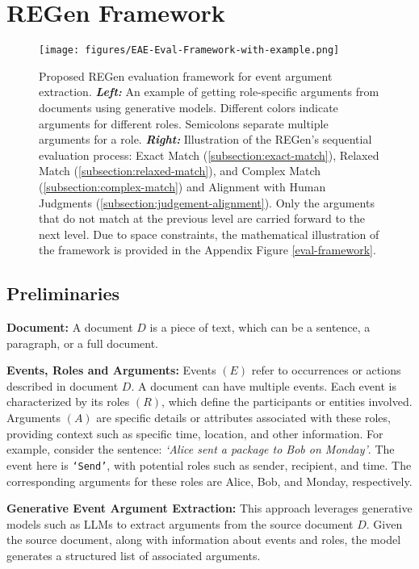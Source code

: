 \section{REGen Framework}
\label{mlm-eval-framework}
\begin{figure*}[t!]
  \centering
  \texttt{[image: figures/EAE-Eval-Framework-with-example.png]}
 \caption{Proposed REGen evaluation framework for event argument extraction. \textbf{\textit{Left:}} An example of getting role-specific arguments from documents using generative models. Different colors indicate arguments for different roles. Semicolons separate multiple arguments for a role.  \textbf{\textit{Right:}} Illustration of the REGen's sequential evaluation process: Exact Match (\ref{subsection:exact-match}), Relaxed Match (\ref{subsection:relaxed-match}), and Complex Match (\ref{subsection:complex-match}) and Alignment with Human Judgments (\ref{subsection:judgement-alignment}). Only the arguments that do not match at the previous level are carried forward to the next level. Due to space constraints, the mathematical illustration of the framework is provided in the Appendix Figure \ref{eval-framework}.}
 \label{eval-framework-example}
\end{figure*}
\subsection{Preliminaries}
\label{dataset-formatting}
\textbf{Document:} A document $D$ is a piece of text, which can be a sentence, a paragraph, or a full document.

\noindent
\textbf{Events, Roles and Arguments:} Events $(E)$ refer to occurrences or actions described in document $D$. A document can have multiple events. Each event is characterized by its roles $(R)$, which define the participants or entities involved. Arguments $(A)$ are specific details or attributes associated with these roles, providing context such as specific time, location, and other information. For example, consider the sentence: \textit{`Alice sent a package to Bob on Monday'}. The event here is \texttt{`Send'}, with potential roles such as sender, recipient, and time. The corresponding arguments for these roles are Alice, Bob, and Monday, respectively. 

\noindent 
\textbf{Generative Event Argument Extraction:}
This approach leverages generative models such as LLMs to extract arguments from the source document $D$. Given the source document, along with information about events and roles, the model generates a structured list of associated arguments.%

